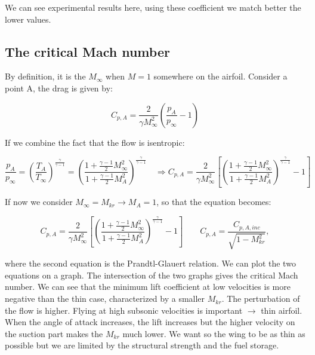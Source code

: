 	\begin{center}
	\end{center}	
	
	We can see experimental results here, using these coefficient we match better the lower values. 
	
\subsection{The critical Mach number}
	By definition, it is the $M_\infty$ when $M = 1$ somewhere on the airfoil. Consider a point A, the drag is given by: 
	
	\begin{equation}
	C_{p,A} = \frac{2}{\gamma M_\infty^2} \left( \frac{p_A}{p_\infty} -1 \right)
	\end{equation}
	
	If we combine the fact that the flow is isentropic:
	
	\begin{equation}
	\frac{p_A}{p_\infty} = \left(\frac{T_A}{T_\infty}\right)^{\frac{\gamma}{\gamma -1}} = \left(\frac{1+\frac{\gamma - 1}{2}M^2_\infty}{1+\frac{\gamma - 1}{2}M^2_A}\right)^{\frac{\gamma}{\gamma -1}} 
	\quad \Rightarrow C_{p,A} = \frac{2}{\gamma M_\infty^2} \left[ \left(\frac{1+\frac{\gamma - 1}{2}M^2_\infty}{1+\frac{\gamma - 1}{2}M^2_A}\right)^{\frac{\gamma}{\gamma -1}} -1 \right]
	\end{equation}
	
	If now we consider $M_\infty = M_{kr} \rightarrow M_A = 1$, so that the equation becomes: 
	
	\begin{equation}
	C_{p,A} = \frac{2}{\gamma M_\infty^2} \left[ \left(\frac{1+\frac{\gamma - 1}{2}M^2_\infty}{1+\frac{\gamma - 1}{2}M^2_A}\right)^{\frac{\gamma}{\gamma -1}} -1 \right] \qquad C_{p,A} = \frac{C_{p,A,inc}}{\sqrt{1-M_{kr}^2}},
	\end{equation}
	


	where the second equation is the Prandtl-Glauert relation. 
	We can plot the two equations on a graph. The intersection of the two graphs gives the critical Mach number. We can see that the minimum lift coefficient at low velocities is more negative than the thin case, characterized by a smaller $M_{kr}$. The perturbation of the flow is higher. Flying at high subsonic velocities is important $\rightarrow$ thin airfoil. When the angle of attack increases, the lift increases but the higher velocity on the suction part makes the $M_{kr}$ much lower. We want so the wing to be as thin as possible but we are limited by the structural strength and the fuel storage.
	
